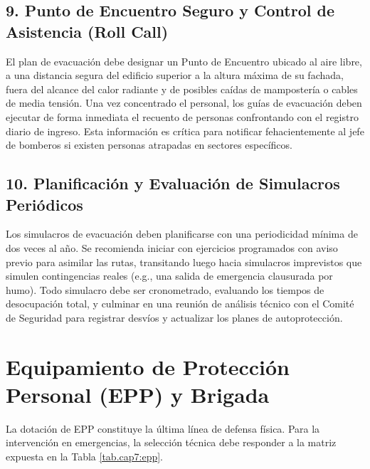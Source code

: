 \subsection{9. Punto de Encuentro Seguro y Control de Asistencia (Roll Call)}
El plan de evacuación debe designar un Punto de Encuentro ubicado al aire libre, a una distancia
segura del edificio superior a la altura máxima de su fachada, fuera del alcance del calor radiante y de posibles caídas
de mampostería o cables de media tensión. Una vez concentrado el personal, los guías de evacuación deben ejecutar de forma
inmediata el recuento de personas confrontando con el registro diario de ingreso. Esta información es
crítica para notificar fehacientemente al jefe de bomberos si existen personas atrapadas en sectores específicos.

\subsection{10. Planificación y Evaluación de Simulacros Periódicos}
Los simulacros de evacuación deben planificarse con una periodicidad mínima de dos veces al año. Se recomienda iniciar con
ejercicios programados con aviso previo para asimilar las rutas, transitando luego hacia simulacros imprevistos que
simulen contingencias reales (e.g., una salida de emergencia clausurada por humo). Todo simulacro debe ser cronometrado,
evaluando los tiempos de desocupación total, y culminar en una reunión de análisis técnico con el
Comité de Seguridad para registrar desvíos y actualizar los planes de autoprotección.

\section{Equipamiento de Protección Personal (EPP) y Brigada}

La dotación de EPP constituye la última línea de defensa física. Para la intervención en emergencias, la selección técnica
debe responder a la matriz expuesta en la Tabla \ref{tab.cap7:epp}.

